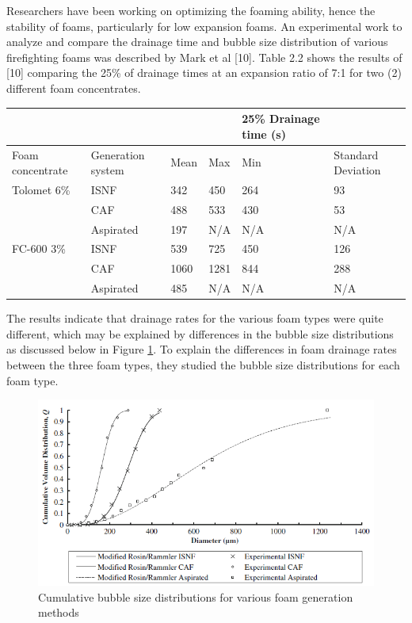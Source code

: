 \documentclass[12pt]{report}
\begin{document}
Researchers have been working on optimizing the foaming ability, hence the stability of foams, particularly for low expansion foams.  An experimental work to analyze and compare the drainage time and bubble size distribution of various firefighting foams was described by Mark et al [10]. Table 2.2 shows the results of [10] comparing the 25\% of drainage times at an expansion ratio of 7:1 for two (2) different foam concentrates. \\

\begin{center}    
\begin{tabular}{m{5em} m{5em} m{4em} m{4em} m{4em} m{5em}}
\hline
& & & & 25\% Drainage time (s) \\
\hline
Foam concentrate & Generation system & Mean & Max & Min & Standard Deviation \\ 
Tolomet 6\% & ISNF & 342 & 450 & 264 & 93 \\
& CAF & 488 & 533 & 430 & 53 \\
& Aspirated & 197 & N/A & N/A & N/A \\
FC-600 3\% & ISNF & 539 & 725 & 450 & 126 \\
& CAF & 1060 & 1281 & 844 & 288 \\
& Aspirated & 485 & N/A & N/A & N/A \\
\hline
\end{tabular}
\end{center}

The results indicate that drainage rates for the various foam types were quite different, which may be explained by differences in the bubble size distributions as discussed below in Figure \ref{ch2:figure:distributions}. To explain the differences in foam drainage rates between the three foam types, they studied the bubble size distributions for each foam type.

\begin{figure}[H]
    \centering
    \includegraphics[width=\textwidth]{bubble_size_distributions.png}
    \caption{Cumulative bubble size distributions for various foam generation methods}
    \label{ch2:figure:distributions}
\end{figure}
\end{document}

